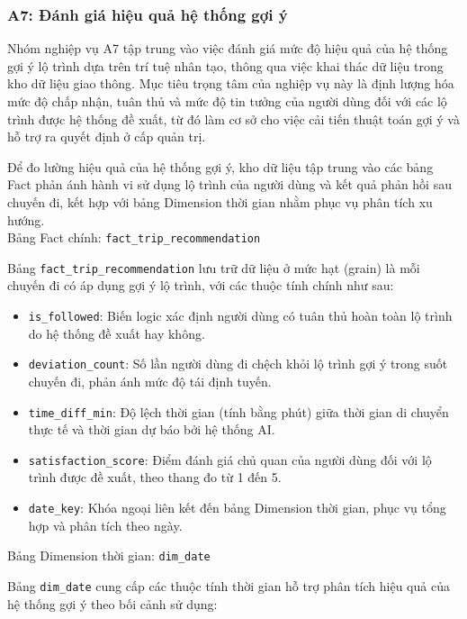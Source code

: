 \subsubsection{A7: Đánh giá hiệu quả hệ thống gợi ý}

Nhóm nghiệp vụ A7 tập trung vào việc đánh giá mức độ hiệu quả của hệ thống gợi ý lộ trình dựa trên trí tuệ nhân tạo, thông qua việc khai thác dữ liệu trong kho dữ liệu giao thông. Mục tiêu trọng tâm của nghiệp vụ này là định lượng hóa mức độ chấp nhận, tuân thủ và mức độ tin tưởng của người dùng đối với các lộ trình được hệ thống đề xuất, từ đó làm cơ sở cho việc cải tiến thuật toán gợi ý và hỗ trợ ra quyết định ở cấp quản trị.


Để đo lường hiệu quả của hệ thống gợi ý, kho dữ liệu tập trung vào các bảng Fact phản ánh hành vi sử dụng lộ trình của người dùng và kết quả phản hồi sau chuyến đi, kết hợp với bảng Dimension thời gian nhằm phục vụ phân tích xu hướng.\\

Bảng Fact chính: \texttt{fact\_trip\_recommendation}

Bảng \texttt{fact\_trip\_recommendation} lưu trữ dữ liệu ở mức hạt (grain) là mỗi chuyến đi có áp dụng gợi ý lộ trình, với các thuộc tính chính như sau:

\begin{itemize}
    \item \texttt{is\_followed}: Biến logic xác định người dùng có tuân thủ hoàn toàn lộ trình do hệ thống đề xuất hay không.
    \item \texttt{deviation\_count}: Số lần người dùng đi chệch khỏi lộ trình gợi ý trong suốt chuyến đi, phản ánh mức độ tái định tuyến.
    \item \texttt{time\_diff\_min}: Độ lệch thời gian (tính bằng phút) giữa thời gian di chuyển thực tế và thời gian dự báo bởi hệ thống AI.
    \item \texttt{satisfaction\_score}: Điểm đánh giá chủ quan của người dùng đối với lộ trình được đề xuất, theo thang đo từ 1 đến 5.
    \item \texttt{date\_key}: Khóa ngoại liên kết đến bảng Dimension thời gian, phục vụ tổng hợp và phân tích theo ngày.
\end{itemize}

Bảng Dimension thời gian: \texttt{dim\_date}

Bảng \texttt{dim\_date} cung cấp các thuộc tính thời gian hỗ trợ phân tích hiệu quả của hệ thống gợi ý theo bối cảnh sử dụng:

